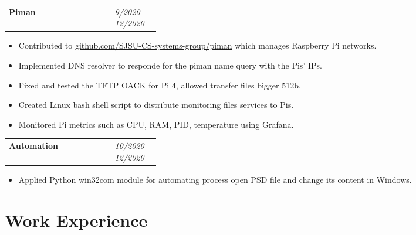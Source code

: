 \documentclass[11pt]{article} %
\begin{document}
\begin{paracol}{2}
\begin{supertabular}{p{.65\linewidth}p{0.3\linewidth}}
   \Large\textbf{Piman} \raggedright & \textit{9/2020 - 12/2020} \\ 
\end{supertabular}
\begin{itemize}
	\setlength\itemsep{-0.5em}
    \item Contributed to \href{https://www.github.com/SJSU-CS-systems-group/piman}{github.com/SJSU-CS-systems-group/piman}
	which manages Raspberry Pi networks.
    \item Implemented DNS resolver to responde for the piman name query with the Pis' IPs.
    \item Fixed and tested the TFTP OACK for Pi 4, allowed transfer files bigger 512b.
    \item Created Linux bash shell script to distribute monitoring files services to Pis.
    \item Monitored Pi metrics such as CPU, RAM, PID, temperature using Grafana.
\end{itemize}

\begin{supertabular}{p{.65\linewidth}p{0.3\linewidth}}
   \Large\textbf{Automation} \raggedright & \textit{10/2020 - 12/2020} \\ 
\end{supertabular}
\begin{itemize}
	\setlength\itemsep{-0.5em}
    \item Applied Python win32com module for automating process open PSD file and change its content in Windows.
\end{itemize}



\section{Work Experience}



\end{paracol}
\end{document}
